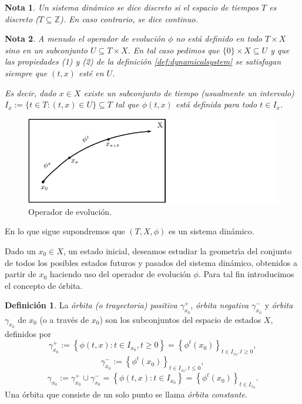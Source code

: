 \documentclass[11pt]{book}
\theoremstyle{definition}
\newtheorem{definition}{Definición}
\numberwithin{definition}{section}
\theoremstyle{theorem}
\numberwithin{theorem}{section}
\numberwithin{lemma}{section}
\numberwithin{corollary}{section}
\theoremstyle{plain}
\numberwithin{example}{section}
\newtheorem{remark}{Nota}
\newcommand{\Z}{{\ensuremath{\mathbb{Z}}}}
\begin{document}
\begin{remark}
Un sistema dinámico se dice \emph{discreto} si el espacio de tiempos $T$ es discreto ($T \subseteq \Z$). En caso contrario, se dice \emph{continuo}.
\end{remark}

\begin{remark}
A menudo el operador de evolución $\phi$ no está definido en todo $T \times X$ sino en un subconjunto $U \subseteq T \times X$. En tal caso pedimos que $\{ 0 \} \times X \subseteq U$ y que las propiedades (1) y (2) de la definición \ref{def:dynamicalsystem} se satisfagan siempre que $(t, x)$ esté en $U$.

Es decir, dado $x \in X$ existe un subconjunto de tiempo (usualmente un intervalo) $I_x := \{ t \in T : (t,x) \in U \} \subseteq T$ tal que $\phi(t,x)$ está definida para todo $t \in I_x$.
\end{remark}

\begin{figure}[!ht] \label{fig:evolutionoperator} \centering
    \includegraphics[scale=1.3]{figures/evolution-operator.pdf}
    \caption{Operador de evolución.}
\end{figure}

En lo que sigue supondremos que $( T, X, \phi )$ es un sistema
dinámico.

Dado un $x_0 \in X$, un estado inicial, deseamos estudiar la geometr\'{\i}a del
conjunto de todos los posibles estados futuros y pasados del sistema
din\'amico, obtenidos a partir de $x_0$ haciendo uso del operador de
evoluci\'on $\phi$.
Para tal fin introducimos el concepto de órbita.

\begin{definition}
  \label{def:orbit}La {\emph{\'orbita (o trayectoria) positiva
  $\gamma^+_{x_0}$}}, {\emph{\'orbita negativa $\gamma^-_{x_0}$}} y
  {\emph{\'orbita $\gamma_{x_0}$}} de $x_0$ (o a trav\'es de $x_0$) son
  los subconjuntos del espacio de estados $X$, definidos por
  \[ \gamma^+_{x_0} := \left\{ \phi \left( t, x \right) : t \in I_{x_0},
     t \geq 0 \right\} = \left\{ \phi^t \left( x_0 \right) \right\}_{t
     \in I_{x_0}, t \geq 0}, \]
  \[ \gamma^-_{x_0} := \left\{ \phi^t \left( x_0 \right) \right\}_{t \in
     I_{x_0}, t \leq 0}, \]
  \[ \gamma_{x_0} := \gamma_{x_0}^+ \cup \gamma_{x_0}^- = \left\{ \phi
     \left( t, x \right) : t \in I_{x_0} \right\} = \left\{ \phi^t \left( x_0
     \right) \right\}_{t \in I_{x_0}} . \]
  Una \'orbita que consiste de un solo punto se llama {\emph{\'orbita
  constante}}.
\end{definition}
\end{document}

